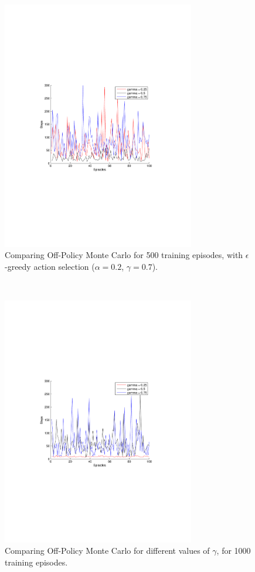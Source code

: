 \documentclass[a4paper,11pt]{article}
\begin{document}
\begin{figure}[h!]
  \centering
    \includegraphics[trim=4cm 8.5cm 4cm 8.5cm,clip,width=0.75\textwidth]{figures/offmc500.pdf}
    \caption{Comparing Off-Policy Monte Carlo for 500 training episodes, with $\epsilon$ -greedy action selection ($\alpha = 0.2$, $\gamma = 0.7$).}
    \label{offmc500}
\end{figure}
~
\begin{figure}[h!]
  \centering
    \includegraphics[trim=4cm 8.5cm 4cm 8.5cm,clip,width=0.75\textwidth]{figures/offmc1000.pdf}
    \caption{Comparing Off-Policy Monte Carlo for different values of $\gamma$, for 1000 training episodes.}
    \label{offmc1000}
\end{figure}
\end{document}
